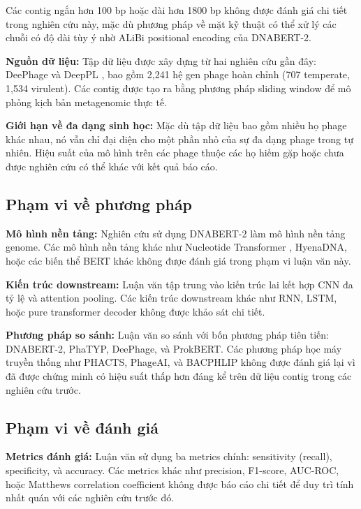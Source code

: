 Các contig ngắn hơn 100 bp hoặc dài hơn 1800 bp không được đánh giá chi tiết trong nghiên cứu này, mặc dù phương pháp về mặt kỹ thuật có thể xử lý các chuỗi có độ dài tùy ý nhờ ALiBi positional encoding của DNABERT-2.

\textbf{Nguồn dữ liệu:} Tập dữ liệu được xây dựng từ hai nghiên cứu gần đây: DeePhage \cite{wu2021deephage} và DeepPL \cite{zhang2024deeppl}, bao gồm 2,241 hệ gen phage hoàn chỉnh (707 temperate, 1,534 virulent). Các contig được tạo ra bằng phương pháp sliding window để mô phỏng kịch bản metagenomic thực tế.

\textbf{Giới hạn về đa dạng sinh học:} Mặc dù tập dữ liệu bao gồm nhiều họ phage khác nhau, nó vẫn chỉ đại diện cho một phần nhỏ của sự đa dạng phage trong tự nhiên. Hiệu suất của mô hình trên các phage thuộc các họ hiếm gặp hoặc chưa được nghiên cứu có thể khác với kết quả báo cáo.

\subsection{Phạm vi về phương pháp}

\textbf{Mô hình nền tảng:} Nghiên cứu sử dụng DNABERT-2 \cite{zhou2023dnabert} làm mô hình nền tảng genome. Các mô hình nền tảng khác như Nucleotide Transformer \cite{dalla2025nucleotide}, HyenaDNA, hoặc các biến thể BERT khác không được đánh giá trong phạm vi luận văn này.

\textbf{Kiến trúc downstream:} Luận văn tập trung vào kiến trúc lai kết hợp CNN đa tỷ lệ và attention pooling. Các kiến trúc downstream khác như RNN, LSTM, hoặc pure transformer decoder không được khảo sát chi tiết.

\textbf{Phương pháp so sánh:} Luận văn so sánh với bốn phương pháp tiên tiến: DNABERT-2, PhaTYP, DeePhage, và ProkBERT. Các phương pháp học máy truyền thống như PHACTS, PhageAI, và BACPHLIP không được đánh giá lại vì đã được chứng minh có hiệu suất thấp hơn đáng kể trên dữ liệu contig trong các nghiên cứu trước.

\subsection{Phạm vi về đánh giá}

\textbf{Metrics đánh giá:} Luận văn sử dụng ba metrics chính: sensitivity (recall), specificity, và accuracy. Các metrics khác như precision, F1-score, AUC-ROC, hoặc Matthews correlation coefficient không được báo cáo chi tiết để duy trì tính nhất quán với các nghiên cứu trước đó.

